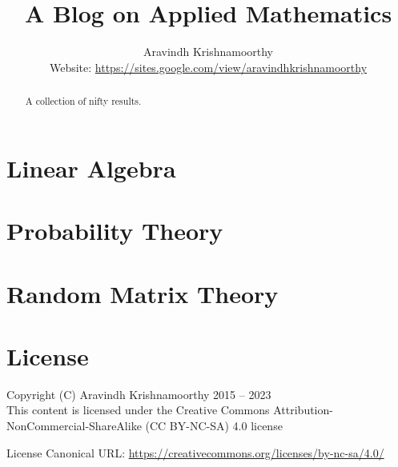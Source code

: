 \documentclass[a4paper,dvipsnames]{report}
\title{A Blog on Applied Mathematics}
\author{Aravindh Krishnamoorthy\\\small Website: \url{https://sites.google.com/view/aravindhkrishnamoorthy}}
\begin{document}
\maketitle
\renewcommand{\abstractname}{Preface}
\begin{abstract}
\begin{center}
 	A collection of nifty results.
\end{center}
\end{abstract}
\tableofcontents

\chapter{Linear Algebra}




\chapter{Probability Theory}





\chapter{Random Matrix Theory}



\chapter{License}
Copyright (C) Aravindh Krishnamoorthy 2015 -- 2023\\
This content is licensed under the Creative Commons Attribution-NonCommercial-ShareAlike (CC BY-NC-SA) 4.0 license

License Canonical URL: \url{https://creativecommons.org/licenses/by-nc-sa/4.0/}



\end{document}
